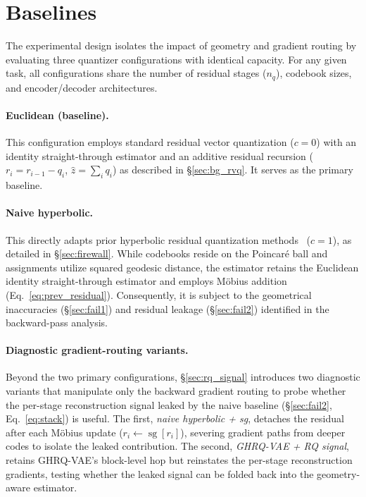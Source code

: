 \documentclass[12pt]{report}
\begin{document}
\section{Baselines}
\label{sec:configs}

The experimental design isolates the impact of geometry and gradient routing by evaluating three quantizer configurations with identical capacity. For any given task, all configurations share the number of residual stages ($n_q$), codebook sizes, and encoder/decoder architectures.

\paragraph{Euclidean (baseline).} This configuration employs standard residual vector quantization ($c=0$) with an identity straight-through estimator and an additive residual recursion ($r_i = r_{i-1}-q_i$, $\hat z=\sum_i q_i$) as described in \S\ref{sec:bg_rvq}. It serves as the primary baseline.

\paragraph{Naive hyperbolic.} This directly adapts prior hyperbolic residual quantization methods~\cite{hrqvae} ($c=1$), as detailed in \S\ref{sec:firewall}. While codebooks reside on the Poincar\'e ball and assignments utilize squared geodesic distance, the estimator retains the Euclidean identity straight-through estimator and employs M\"obius addition (Eq.~\ref{eq:prev_residual}). Consequently, it is subject to the geometrical inaccuracies (\S\ref{sec:fail1}) and residual leakage (\S\ref{sec:fail2}) identified in the backward-pass analysis.

\paragraph{Diagnostic gradient-routing variants.} Beyond the two primary configurations, \S\ref{sec:rq_signal} introduces two diagnostic variants that manipulate only the backward gradient routing to probe whether the per-stage reconstruction signal leaked by the naive baseline (\S\ref{sec:fail2}, Eq.~\ref{eq:stack}) is useful. The first, \emph{naive hyperbolic + sg}, detaches the residual after each M\"obius update ($r_i\leftarrow\operatorname{sg}[r_i]$), severing gradient paths from deeper codes to isolate the leaked contribution. The second, \emph{GHRQ-VAE + RQ signal}, retains GHRQ-VAE's block-level hop but reinstates the per-stage reconstruction gradients, testing whether the leaked signal can be folded back into the geometry-aware estimator.
\end{document}
